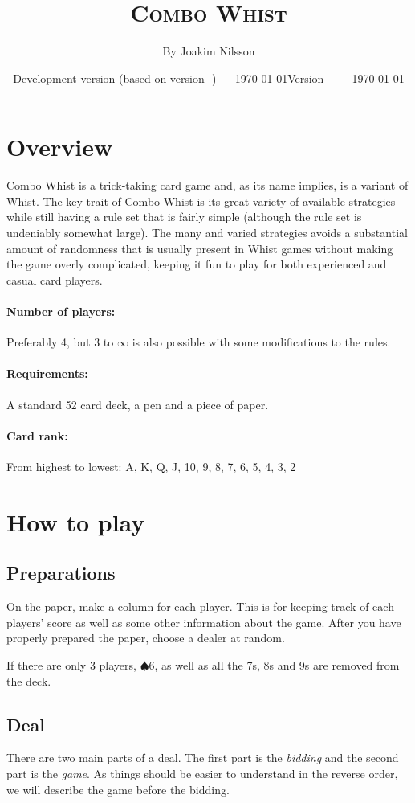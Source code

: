 \documentclass[a4paper]{article}
\title{\textsc{Combo Whist}}
\author{By Joakim Nilsson}
\date{Development version (based on version \varVersion-\varLanguage) --- \today}
\date{Version \varVersion-\varLanguage\ --- \today}
\begin{document}
	\introPages

	\section{Overview}
		Combo Whist is a trick-taking card game and, as its name implies, is a variant of Whist. The key trait of Combo Whist is its great variety of available strategies while still having a rule set that is fairly simple (although the rule set is undeniably somewhat large). The many and varied strategies avoids a substantial amount of randomness that is usually present in Whist games without making the game overly complicated, keeping it fun to play for both experienced and casual card players.

		\paragraph{Number of players:}
			Preferably 4, but 3 to $\infty$ is also possible with some modifications to the rules.

		\paragraph{Requirements:}
			A standard 52 card deck, a pen and a piece of paper.

		\paragraph{Card rank:}
			From highest to lowest: A, K, Q, J, 10, 9, 8, 7, 6, 5, 4, 3, 2

	\section{How to play}
		\subsection{Preparations}
			On the paper, make a column for each player. This is for keeping track of each players' score as well as some other information about the game. After you have properly prepared the paper, choose a dealer at random.

			If there are only 3 players, $\spadesuit 6$, as well as all the 7s, 8s and 9s are removed from the deck.

		\subsection{Deal}
			There are two main parts of a deal. The first part is the \emph{bidding} and the second part is the \emph{game}. As things should be easier to understand in the reverse order, we will describe the game before the bidding.
\end{document}

